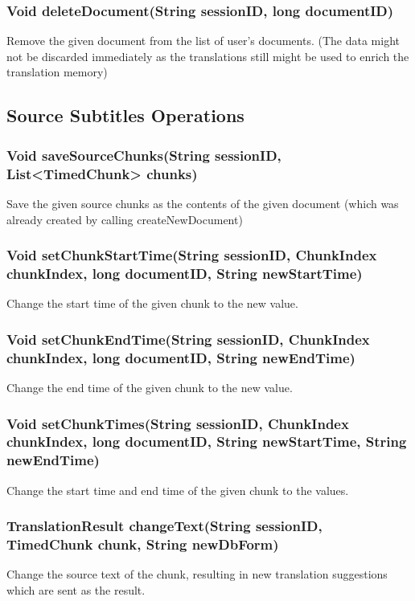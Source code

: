 \subsubsection{Void deleteDocument(String sessionID, long documentID)}
Remove the given document from the list of user's documents.
(The data might not be discarded immediately
as the translations still might be used to enrich the translation memory)	 

\subsection{Source Subtitles Operations}

\subsubsection{Void saveSourceChunks(String sessionID, List<TimedChunk> chunks)}
Save the given source chunks as the contents of the given document
(which was already created by calling createNewDocument)	 

\subsubsection{Void setChunkStartTime(String sessionID, ChunkIndex chunkIndex, long documentID, String newStartTime)}
Change the start time of the given chunk to the new value.

\subsubsection{Void setChunkEndTime(String sessionID, ChunkIndex chunkIndex, long documentID, String newEndTime)}
Change the end time of the given chunk to the new value.

\subsubsection{Void setChunkTimes(String sessionID, ChunkIndex chunkIndex, long documentID, String newStartTime, String newEndTime)}
Change the start time and end time of the given chunk to the values.

\subsubsection{TranslationResult changeText(String sessionID, TimedChunk chunk, String newDbForm)}
Change the source text of the chunk,
resulting in new translation suggestions
which are sent as the result.

